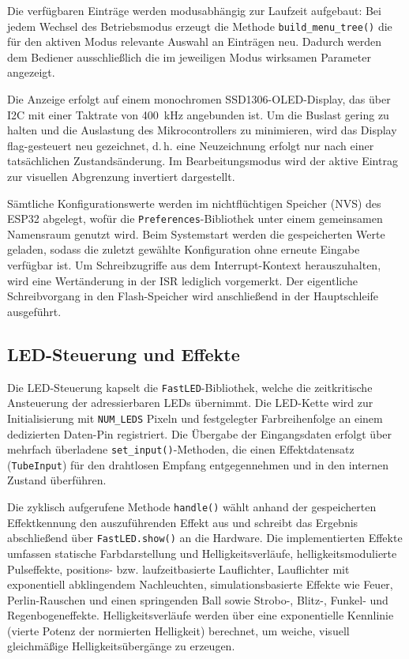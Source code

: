 Die verfügbaren Einträge werden modusabhängig zur Laufzeit aufgebaut:
Bei jedem Wechsel des Betriebsmodus erzeugt die Methode
\texttt{build\_menu\_tree()} die für den aktiven Modus relevante Auswahl
an Einträgen neu. Dadurch werden dem Bediener ausschließlich die im
jeweiligen Modus wirksamen Parameter angezeigt.

Die Anzeige erfolgt auf einem monochromen SSD1306-OLED-Display, das über
I2C mit einer Taktrate von 400~kHz angebunden ist. Um die Buslast gering
zu halten und die Auslastung des Mikrocontrollers zu minimieren, 
wird das Display flag-gesteuert neu gezeichnet, d.\,h. eine
Neuzeichnung erfolgt nur nach einer tatsächlichen Zustandsänderung. Im
Bearbeitungsmodus wird der aktive Eintrag zur visuellen Abgrenzung
invertiert dargestellt.

Sämtliche Konfigurationswerte werden im nichtflüchtigen Speicher (NVS)
des ESP32 abgelegt, wofür die \texttt{Preferences}-Bibliothek unter einem
gemeinsamen Namensraum genutzt wird. Beim Systemstart werden die
gespeicherten Werte geladen, sodass die zuletzt gewählte Konfiguration
ohne erneute Eingabe verfügbar ist. Um Schreibzugriffe aus dem
Interrupt-Kontext herauszuhalten, wird eine Wertänderung in der ISR
lediglich vorgemerkt. Der eigentliche Schreibvorgang in den
Flash-Speicher wird anschließend in der Hauptschleife ausgeführt.

\subsection{LED-Steuerung und Effekte}
\label{subsec:led-steuerung}

Die LED-Steuerung kapselt die \texttt{FastLED}-Bibliothek, welche die
zeitkritische Ansteuerung der adressierbaren LEDs übernimmt. Die
LED-Kette wird zur Initialisierung mit \texttt{NUM\_LEDS} Pixeln und
festgelegter Farbreihenfolge an einem dedizierten Daten-Pin registriert.
Die Übergabe der Eingangsdaten erfolgt über mehrfach überladene
\texttt{set\_input()}-Methoden, die einen Effektdatensatz 
(\texttt{TubeInput}) für den drahtlosen Empfang entgegennehmen 
und in den internen Zustand überführen.

Die zyklisch aufgerufene Methode \texttt{handle()} wählt anhand der gespeicherten Effektkennung den
auszuführenden Effekt aus und schreibt das Ergebnis abschließend über
\texttt{FastLED.show()} an die Hardware. Die implementierten
Effekte umfassen statische Farbdarstellung und Helligkeitsverläufe,
helligkeitsmodulierte Pulseffekte, positions- bzw. laufzeitbasierte
Lauflichter, Lauflichter mit exponentiell abklingendem Nachleuchten,
simulationsbasierte Effekte wie Feuer, Perlin-Rauschen und einen
springenden Ball sowie Strobo-, Blitz-, Funkel- und Regenbogeneffekte.
Helligkeitsverläufe werden über eine exponentielle Kennlinie (vierte
Potenz der normierten Helligkeit) berechnet, um weiche, visuell
gleichmäßige Helligkeitsübergänge zu erzeugen.

